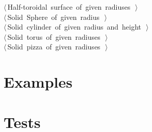 \documentclass[11pt,oneside]{article}	%
\begin{document}
\begin{flushleft}
\begin{list}{}{}
\mbox{}\verb@@\hbox{$\langle\,$Half-toroidal surface of given radiuses\nobreak\ {\footnotesize {}}$\,\rangle$}\verb@@\\
\mbox{}\verb@@\hbox{$\langle\,$Solid Sphere of given radius\nobreak\ {\footnotesize {}}$\,\rangle$}\verb@@\\
\mbox{}\verb@@\hbox{$\langle\,$Solid cylinder of given radius and height\nobreak\ {\footnotesize {}}$\,\rangle$}\verb@@\\
\mbox{}\verb@@\hbox{$\langle\,$Solid torus of given radiuses\nobreak\ {\footnotesize {}}$\,\rangle$}\verb@@\\
\mbox{}\verb@@\hbox{$\langle\,$Solid pizza of given radiuses\nobreak\ {\footnotesize {}}$\,\rangle$}\verb@@\\
\mbox{}\verb@@{\NWsep}
\end{list}
\vspace{-2ex}
\end{flushleft}
\section{Examples}
\section{Tests}
\end{document}
